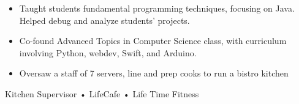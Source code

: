 \documentclass[11pt]{article}
\begin{document}
\vspace{1mm}
{\fontsize{10}{12}\robotocondlight
    \begin{itemize}[noitemsep,nolistsep]
        \item Taught students fundamental programming techniques, focusing on Java. Helped debug and analyze students’ projects. 
        \item Co-found Advanced Topics in Computer Science class, with curriculum involving Python, webdev, Swift, and Arduino. 
    \end{itemize}
    \begin{itemize}[noitemsep,nolistsep]
        \item Oversaw a staff of 7 servers, line and prep cooks to run a bistro kitchen
    \end{itemize}
    Kitchen Supervisor • LifeCafe • Life Time Fitness
}
\hsep
\vspace{-3mm}
\end{document}
